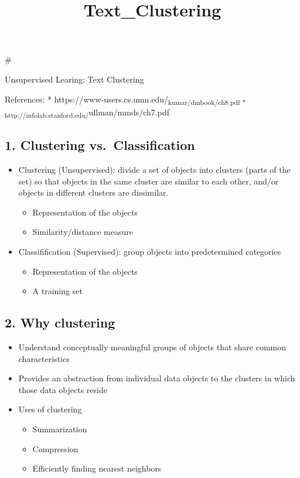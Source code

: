 \documentclass[11pt]{article}
\title{Text\_Clustering}
\providecommand{\tightlist}{%
      \setlength{\itemsep}{0pt}\setlength{\parskip}{0pt}}
\begin{document}
    
    
    \maketitle
    
    

    
    \#

Unsupervised Learing: Text Clustering

References: *
https://www-users.cs.umn.edu/\textsubscript{kumar/dmbook/ch8.pdf *
http://infolab.stanford.edu/}ullman/mmds/ch7.pdf

    \hypertarget{clustering-vs.classification}{%
\subsection{1. Clustering
vs.~Classification}\label{clustering-vs.classification}}

\begin{itemize}
\tightlist
\item
  Clustering (Unsupervised): divide a set of objects into clusters
  (parts of the set) so that objects in the same cluster are similar to
  each other, and/or objects in different clusters are dissimilar.

  \begin{itemize}
  \tightlist
  \item
    Representation of the objects
  \item
    Similarity/distance measure
  \end{itemize}
\item
  Classifification (Supervised): group objects into predetermined
  categories

  \begin{itemize}
  \tightlist
  \item
    Representation of the objects
  \item
    A training set
  \end{itemize}
\end{itemize}

    \hypertarget{why-clustering}{%
\subsection{2. Why clustering}\label{why-clustering}}

\begin{itemize}
\tightlist
\item
  Understand conceptually meaningful groups of objects that share common
  characteristics
\item
  Provides an abstraction from individual data objects to the clusters
  in which those data objects reside
\item
  Uses of clustering

  \begin{itemize}
  \tightlist
  \item
    Summarization
  \item
    Compression
  \item
    Efficiently finding nearest neighbors
  \end{itemize}
\end{itemize}
\end{document}
